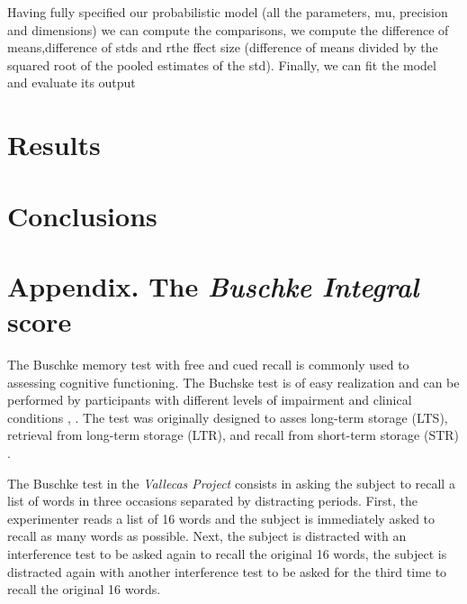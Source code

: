 \documentclass[11pt]{article}
\theoremstyle{definition}
\theoremstyle{remark}
\begin{document}
Having fully specified our probabilistic model (all the parameters, mu, precision and dimensions) we can compute the comparisons, we compute the difference of means,difference of stds and rthe ffect size (difference of means divided by the squared root of the pooled estimates of the std).
Finally, we can fit the model and evaluate its output

\section{Results}
\label{se:res}



\section{Conclusions}
\label{se:con}


\newpage
\section{Appendix. The \emph{Buschke Integral} score}
\label{se:appbusint}

The Buschke memory test with free and cued recall is commonly used to assessing cognitive functioning. The Buchske test is of easy realization and can be performed by participants with different levels of impairment and clinical conditions \cite{o200212}, \cite{leitner2017comparison}. The test was originally designed to asses long-term storage (LTS), retrieval from long-term storage (LTR), and recall from short-term storage (STR) \cite{buschke1973selective}.

The Buschke test in the \emph{Vallecas Project} consists in asking the subject to recall a list of words in three occasions separated by distracting periods. First, the experimenter reads a list of 16 words and the subject is immediately asked to recall as many words as possible. Next, the subject is distracted with an interference test to be asked again to recall the original 16 words, the subject is distracted again with another interference test to be asked for the third time to recall the original 16 words.
\end{document}
